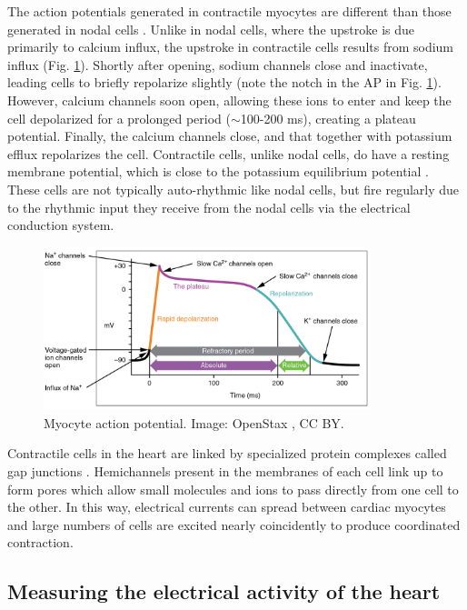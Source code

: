 \documentclass[12pt]{article}
\begin{document}
The action potentials generated in contractile myocytes are different than those generated in nodal cells \cite{mohrman2006cardiovascular,openStaxElectrical}. Unlike in nodal cells, where the upstroke is due primarily to calcium influx, the upstroke in contractile cells results from sodium influx (Fig. \ref{fig:ventAP}). Shortly after opening, sodium channels close and inactivate, leading cells to briefly repolarize slightly (note the notch in the AP in Fig. \ref{fig:ventAP}). However, calcium channels soon open, allowing these ions to enter and keep the cell depolarized for a prolonged period ($\sim$100-200 ms), creating a plateau potential. Finally, the calcium channels close, and that together with potassium efflux repolarizes the cell. Contractile cells, unlike nodal cells, do have a resting membrane potential, which is close to the potassium equilibrium potential \cite{mohrman2006cardiovascular,openStaxElectrical}. These cells are not typically auto-rhythmic like nodal cells, but fire regularly due to the rhythmic input they receive from the nodal cells via the electrical conduction system.

\begin{figure}[h!]
\centering
\includegraphics[width=0.85\textwidth]{figures/ventricularAP.jpg}
\caption{Myocyte action potential. Image: OpenStax \citep{openStaxElectrical}, CC BY.}
\label{fig:ventAP}
\end{figure}

Contractile cells in the heart are linked by specialized protein complexes called gap junctions \cite{openStaxElectrical,mohrman2006cardiovascular}. Hemichannels present in the membranes of each cell link up to form pores which allow small molecules and ions to pass directly from one cell to the other. In this way, electrical currents can spread between cardiac myocytes and large numbers of cells are excited nearly coincidently to produce coordinated contraction.

\subsection*{Measuring the electrical activity of the heart}
\end{document}
